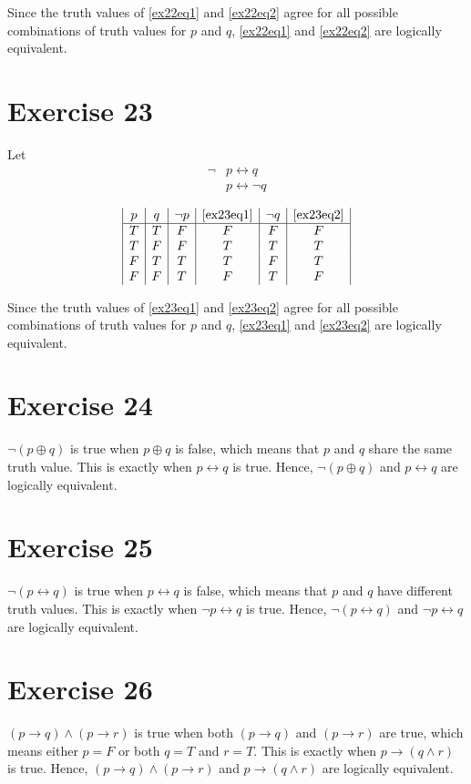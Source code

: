 \documentclass{article}
\let\biconditional\leftrightarrow
\let\conditional\rightarrow
\begin{document}
Since the truth values of \eqref{ex22eq1} and \eqref{ex22eq2} agree for all possible combinations of truth values for $p$ and $q$, \eqref{ex22eq1} and \eqref{ex22eq2} are logically equivalent.

\pagebreak
\section{Exercise 23}
Let
\begin{align}
	\neg & p \biconditional q \label{ex23eq1}      \\
	     & p \biconditional \neg q \label{ex23eq2}
\end{align}

\[
	\begin{array}{|c|c|c|c|c|c|}
		p & q & \neg p & \eqref{ex23eq1} & \neg q & \eqref{ex23eq2} \\
		\hline
		T & T & F      & F               & F      & F               \\
		T & F & F      & T               & T      & T               \\
		F & T & T      & T               & F      & T               \\
		F & F & T      & F               & T      & F
	\end{array}
\]

Since the truth values of \eqref{ex23eq1} and \eqref{ex23eq2} agree for all possible combinations of truth values for $p$ and $q$, \eqref{ex23eq1} and \eqref{ex23eq2} are logically equivalent.

\pagebreak
\section{Exercise 24}
$\neg (p \oplus q)$ is true when $p \oplus q$ is false, which means that $p$ and $q$ share the same truth value. This is exactly when $p \biconditional q$ is true. Hence, $\neg (p \oplus q)$ and $p \biconditional q$ are logically equivalent.

\pagebreak
\section{Exercise 25}
$\neg (p \biconditional q)$ is true when $p \biconditional q$ is false, which means that $p$ and $q$ have different truth values. This is exactly when $\neg p \biconditional q$ is true. Hence, $\neg (p \biconditional q)$ and $\neg p \biconditional q$ are logically equivalent.

\pagebreak
\section{Exercise 26}
$(p \conditional q) \land (p \conditional r)$ is true when both $(p \conditional q)$ and $(p \conditional r)$ are true, which means either $p = F$ or both $q = T$ and $r = T$. This is exactly when $p \conditional (q \land r)$ is true. Hence, $(p \conditional q) \land (p \conditional r)$ and $p \conditional (q \land r)$ are logically equivalent.
\end{document}
